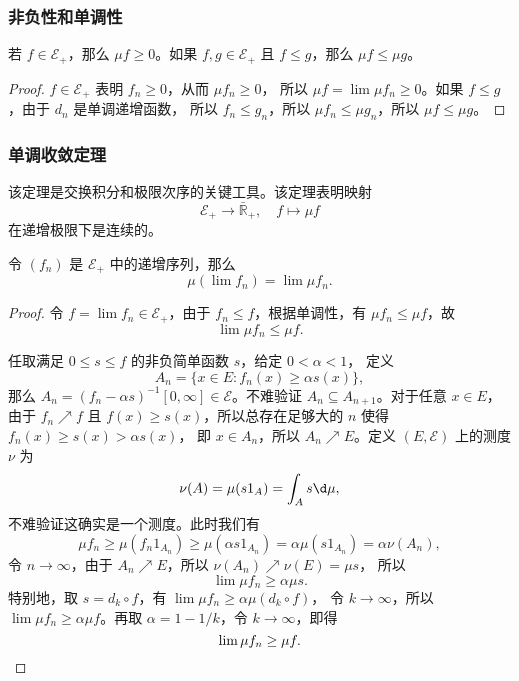 \documentclass[fontset=none]{Notes}
\begin{document}
\subsubsection{非负性和单调性}

\begin{proposition}
  若 $f\in \mathcal{E}_+$，那么 $\mu f\geq 0$。如果 $f,g\in \mathcal{E}_+$
  且 $f\leq g$，那么 $\mu f\leq \mu g$。
\end{proposition}
\begin{proof}
  $f\in \mathcal{E}_+$ 表明 $f_n\geq 0$，从而 $\mu f_n\geq 0$，
  所以 $\mu f=\lim\mu f_n\geq 0$。如果 $f\leq g$，由于 $d_n$ 是单调递增函数，
  所以 $f_n\leq g_n$，所以 $\mu f_n\leq \mu g_n$，所以 $\mu f\leq \mu g$。
\end{proof}

\subsubsection{单调收敛定理}

该定理是交换积分和极限次序的关键工具。该定理表明映射
\[
  \mathcal{E}_+\to\bar{\mathbb{R}}_+,\quad f\mapsto \mu f  
\]
在递增极限下是连续的。

\begin{theorem}
  令 $(f_n)$ 是 $\mathcal{E}_+$ 中的递增序列，那么
  \[
    \mu(\lim f_n)=\lim\mu f_n.  
  \]
\end{theorem}
\begin{proof}
  令 $f=\lim f_n\in \mathcal{E}_+$，由于 $f_n\leq f$，根据单调性，有
  $\mu f_n\leq \mu f$，故
  \[
    \lim \mu f_n\leq \mu f.  
  \]

  任取满足 $0\leq s\leq f$ 的非负简单函数 $s$，给定 $0<\alpha <1$，
  定义
  \[
    A_n=\{x\in E:f_n(x)\geq \alpha s(x)\},
  \]
  那么 $A_n=(f_n-\alpha s)^{-1}[0,\infty]\in \mathcal{E}$。不难验证
  $A_n\subseteq A_{n+1}$。对于任意 $x\in E$，由于 $f_n\nearrow f$
  且 $f(x)\geq s(x)$，所以总存在足够大的 $n$ 使得 $f_n(x)\geq s(x)>\alpha s(x)$，
  即 $x\in A_n$，所以 $A_n\nearrow E$。定义 $(E,\mathcal{E})$ 上的测度
  $\nu$ 为
  \[
    \nu(A)=\mu(s1_A)=\int_A s\d \mu,  
  \]
  不难验证这确实是一个测度。此时我们有
  \[
    \mu f_n\geq \mu(f_n1_{A_n})\geq \mu(\alpha s1_{A_n})=\alpha\mu(s1_{A_n})
    =\alpha\nu(A_n),  
  \]
  令 $n\to\infty$，由于 $A_n\nearrow E$，所以 $\nu(A_n)\nearrow \nu(E)=\mu s$，
  所以
  \[
    \lim \mu f_n\geq \alpha\mu s.  
  \]
  特别地，取 $s=d_k\circ f$，有 $\lim \mu f_n\geq \alpha\mu(d_k\circ f)$，
  令 $k\to\infty$，所以 $\lim \mu f_n\geq \alpha\mu f$。再取
  $\alpha=1-1/k$，令 $k\to\infty$，即得
  \[
    \lim\mu f_n\geq \mu f.  \qedhere
  \]
\end{proof}
\end{document}
